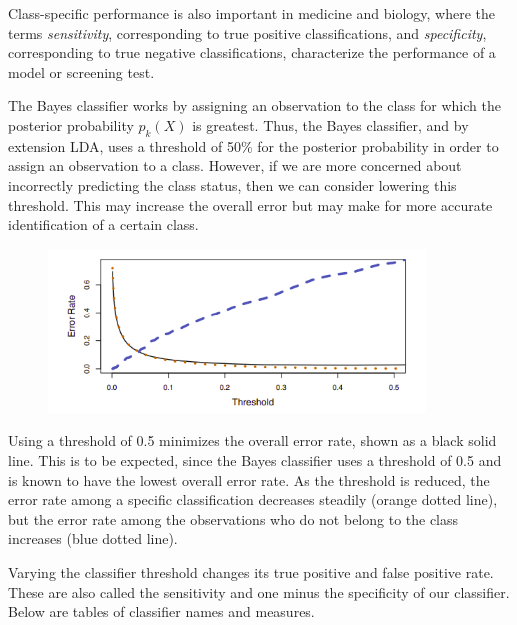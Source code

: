\documentclass{article}
\numberwithin{equation}{section}
\begin{document}
\begin{enumerate}
Class-specific performance is also important in medicine and biology, where the terms \textit{sensitivity}, corresponding to true positive classifications, and \textit{specificity}, corresponding to true negative classifications, characterize the performance of a model or screening test.

The Bayes classifier works by assigning an observation to the class for which the posterior probability $p_k(X)$ is greatest. Thus, the Bayes classifier, and by extension LDA, uses a threshold of 50\% for the posterior probability in order to assign an observation to a class. However, if we are more concerned about incorrectly predicting the class status, then we can consider lowering this threshold. This may increase the overall error but may make for more accurate identification of a certain class.

\begin{figure}[H]
    \centering
    \includegraphics[width=10cm]{err-threshold.png}
\end{figure}
Using a threshold of 0.5 minimizes the overall error rate, shown as a black solid line. This is to be expected, since the Bayes classifier uses a threshold of 0.5 and is known to have the lowest overall error rate. As the threshold is reduced, the error rate among a specific classification decreases steadily (orange dotted line), but the error rate among the observations who do not belong to the class increases (blue dotted line).

Varying the classifier threshold changes its true positive and false positive rate. These are also called the sensitivity and one minus the specificity of our classifier. Below are tables of classifier names and measures.


\end{enumerate}
\end{document}
